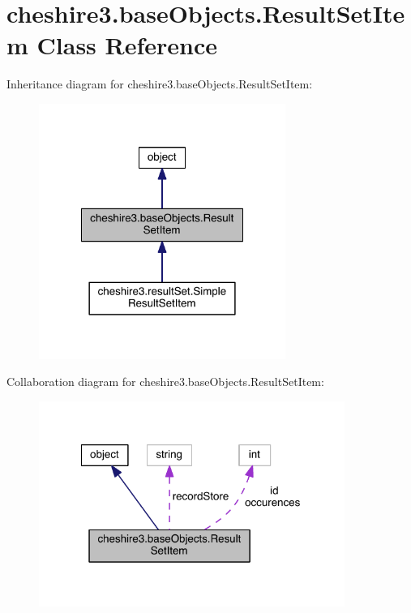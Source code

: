 \hypertarget{classcheshire3_1_1base_objects_1_1_result_set_item}{\section{cheshire3.\-base\-Objects.\-Result\-Set\-Item Class Reference}
\label{classcheshire3_1_1base_objects_1_1_result_set_item}
}


Inheritance diagram for cheshire3.\-base\-Objects.\-Result\-Set\-Item\-:
\nopagebreak
\begin{figure}[H]
\begin{center}
\leavevmode
\includegraphics[width=228pt]{classcheshire3_1_1base_objects_1_1_result_set_item__inherit__graph}
\end{center}
\end{figure}


Collaboration diagram for cheshire3.\-base\-Objects.\-Result\-Set\-Item\-:
\nopagebreak
\begin{figure}[H]
\begin{center}
\leavevmode
\includegraphics[width=283pt]{classcheshire3_1_1base_objects_1_1_result_set_item__coll__graph}
\end{center}
\end{figure}
